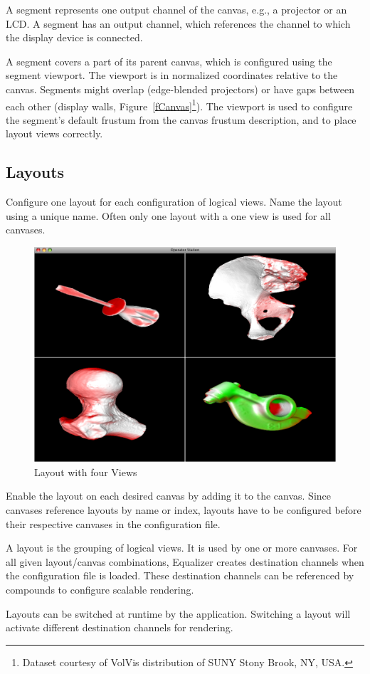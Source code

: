 \documentclass[10pt,a4]{scrartcl}
\newcommand{\fig}[1]{Figure~\ref{#1}}
\begin{document}
A segment represents one output channel of the canvas, e.g., a projector
or an LCD. A segment has an output channel, which references the channel to
which the display device is connected.

A segment covers a part of its parent canvas, which is configured using the
segment viewport. The viewport is in normalized coordinates relative to the
canvas. Segments might overlap (edge-blended projectors) or have gaps between
each other (display walls, \fig{fCanvas}\footnote{Dataset courtesy of VolVis
  distribution of SUNY Stony Brook, NY, USA.}). The viewport is used to
configure the segment's default frustum from the canvas frustum description, and
to place layout views correctly.

\subsection{\label{sLayout}Layouts}

Configure one \textsf{layout} for each configuration of logical
views. Name the layout using a unique name. Often only one layout with a
one view is used for all canvases.

\begin{figure}
  \includegraphics[width=.382\textwidth]{images/layout.png}
  {\caption{\label{fLayout}Layout with four Views}}
\end{figure}
Enable the layout on each desired canvas by adding it to the
canvas. Since canvases reference layouts by name or index, layouts have
to be configured before their respective canvases in the configuration
file.

A layout is the grouping of logical views. It is used by one or more
canvases. For all given layout/canvas combinations, Equalizer creates
destination channels when the configuration file is loaded. These
destination channels can be referenced by compounds to configure
scalable rendering.

Layouts can be switched at runtime by the application. Switching a
layout will activate different destination channels for rendering.
\end{document}
